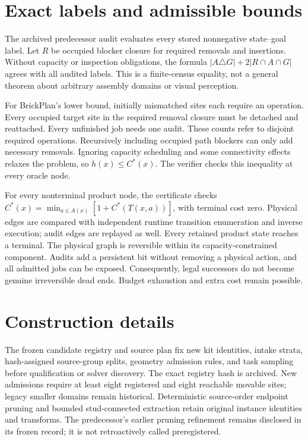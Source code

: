 
\section{Exact labels and admissible bounds}
The archived predecessor audit evaluates every stored nonnegative
state--goal label. Let $R$ be occupied blocker closure for required
removals and insertions. Without capacity or inspection obligations, the
formula $|A\triangle G|+2|R\cap A\cap G|$ agrees with all
\OldLabels{} audited labels. This is a finite-census equality, not a
general theorem about arbitrary assembly domains or visual perception.

For BrickPlan's lower bound, initially mismatched sites each require an
operation. Every occupied target site in the required removal closure
must be detached and reattached. Every unfinished job needs one audit.
These counts refer to disjoint required operations. Recursively including
occupied path blockers can only add necessary removals. Ignoring capacity
scheduling and some connectivity effects relaxes the problem, so
$h(x)\leq C^*(x)$. The verifier checks this inequality at every oracle node.

For every nonterminal product node, the certificate checks
$C^*(x)=\min_{a\in A(x)}[1+C^*(T(x,a))]$, with terminal cost zero.
Physical edges are compared with independent runtime transition
enumeration and inverse execution; audit edges are replayed as well.
Every retained product state reaches a terminal. The physical graph is
reversible within its capacity-constrained component. Audits add a
persistent bit without removing a physical action, and all admitted jobs
can be exposed. Consequently, legal successors do not become genuine
irreversible dead ends. Budget exhaustion and extra cost remain possible.

\section{Construction details}
The frozen candidate registry and source plan fix new kit identities,
intake strata, hash-assigned source-group splits, geometry admission rules,
and task sampling before qualification or solver discovery. The exact
registry hash is archived. New admissions require at least eight registered
and eight reachable movable sites; legacy smaller domains remain historical.
Deterministic source-order endpoint pruning and bounded stud-connected
extraction retain original instance identities and transforms. The
predecessor's earlier pruning refinement remains disclosed in its frozen
record; it is not retroactively called preregistered.

